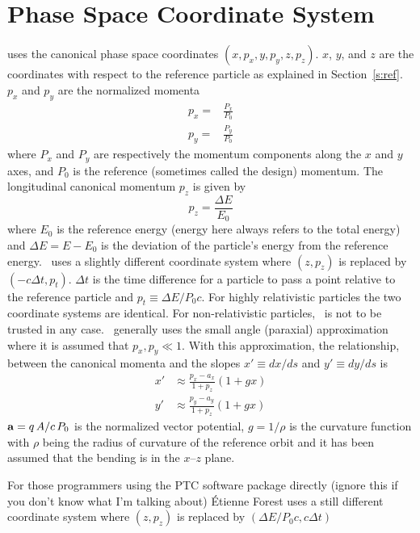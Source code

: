 \section{Phase Space Coordinate System}
\label{s:phase_space_coords}

\bmad uses the canonical phase space coordinates 
$(x, p_x, y, p_y, z, p_z)$. $x$, $y$, and $z$ are the
coordinates with respect to the reference particle as explained in
Section~\ref{s:ref}. $p_x$ and $p_y$ are the normalized momenta
\begin{align}
  p_x = &\frac{P_x}{P_0} \\
  p_y = &\frac{P_y}{P_0}
\end{align}
where $P_x$ and $P_y$ are respectively the momentum components along the $x$ and
$y$ axes, and $P_0$ is the reference (sometimes called the
design) momentum. The longitudinal canonical momentum $p_z$ is given by
\begin{equation}
  p_z = \frac{\Delta E}{E_0}
\end{equation}
where $E_0$ is the reference energy (energy here always refers to the 
total energy) and $\Delta E = E - E_0$ is the
deviation of the particle's energy from the reference energy. \mad\ uses
a slightly different coordinate system where $(z, p_z)$ is
replaced by $(-c\Delta t, p_t)$. $\Delta t$ is the time
difference for a particle to pass a point relative to the reference
particle and $p_t \equiv \Delta E / P_0 c$. For highly relativistic
particles the two coordinate systems are identical. For
non-relativistic particles, \bmad\ is not to be trusted in any
case. \bmad\ generally uses the small angle (paraxial) approximation
where it is assumed that $p_x, p_y \ll 1$. With this approximation, the
relationship, between the canonical momenta and the slopes $x' \equiv dx/ds$
and $y' \equiv dy/ds$ is
\begin{align}
  x' &\approx \frac{p_x - a_x}{1 + p_z} (1 + g x) \\
  y' &\approx \frac{p_y - a_y}{1 + p_z} (1 + g x) 
\end{align}
${\bf a} = q \, A / c \, P_0$ is the normalized vector potential,
$g = 1/\rho$ is the curvature function with $\rho$ being the radius
of curvature of the reference orbit and it has been assumed that the 
bending is in the $x$--$z$ plane.

For those programmers using the PTC software package directly (ignore
this if you don't know what I'm talking about) \'Etienne Forest uses a still
different coordinate system where $(z, p_z)$ is replaced by
$(\Delta E/P_0 c, c \Delta t)$